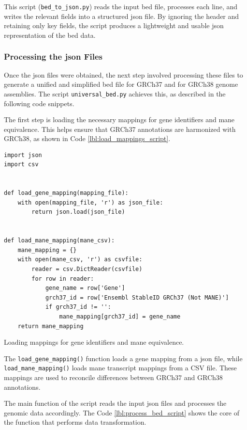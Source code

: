 This script (\texttt{bed\_to\_json.py}) reads the input \ac{bed} file, processes each line, and writes the relevant fields into a structured \ac{json} file. By ignoring the header and retaining only key fields, the script produces a lightweight and usable \ac{json} representation of the \ac{bed} data.

\subsubsection{\textbf{Processing the \ac{json} Files}}

Once the \ac{json} files were obtained, the next step involved processing these files to generate a unified and simplified \ac{bed} file for GRCh37 and for GRCh38 genome assemblies. The script \texttt{universal\_bed.py} achieves this, as described in the following code snippets.

The first step is loading the necessary mappings for gene identifiers and \ac{mane} equivalence. This helps ensure that GRCh37 annotations are harmonized with GRCh38, as shown in Code \ref{lbl:load_mappings_script}.

\begin{longlisting}
\begin{verbatim}
import json
import csv


def load_gene_mapping(mapping_file):
    with open(mapping_file, 'r') as json_file:
        return json.load(json_file)


def load_mane_mapping(mane_csv):
    mane_mapping = {}
    with open(mane_csv, 'r') as csvfile:
        reader = csv.DictReader(csvfile)
        for row in reader:
            gene_name = row['Gene']
            grch37_id = row['Ensembl StableID GRCh37 (Not MANE)']
            if grch37_id != '':
                mane_mapping[grch37_id] = gene_name
    return mane_mapping
\end{verbatim}
\caption{Loading mappings for gene identifiers and \ac{mane} equivalence.}
\label{lbl:load_mappings_script}
\end{longlisting}

The \texttt{load\_gene\_mapping()} function loads a gene mapping from a \ac{json} file, while \texttt{load\_mane\_mapping()} loads \ac{mane} transcript mappings from a CSV file. These mappings are used to reconcile differences between GRCh37 and GRCh38 annotations.

The main function of the script reads the input \ac{json} files and processes the genomic data accordingly. The Code \ref{lbl:process_bed_script} shows the core of the function that performs data transformation.

